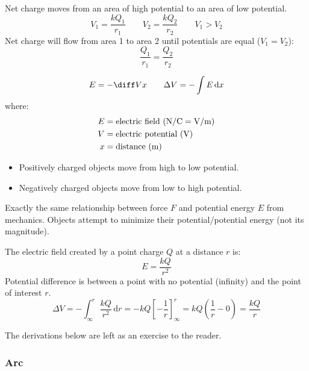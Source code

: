 \documentclass{article}
\newcommand{\theorem}[2]{\begin{tcolorbox}[title={#1},colback=blue!5!white,colframe=blue!75!black,parbox=false] #2 \end{tcolorbox}}
\newcommand{\example}[2]{\begin{tcolorbox}[title={Example: #1},colback=brown!5!white,colframe=brown!75!black,parbox=false] #2 \end{tcolorbox}}
\begin{document}
\theorem{Net charge and potential}{
	Net charge moves from an area of high potential to an area of low potential.
	\begin{equation*}
		V_1=\frac{kQ_1}{r_1} \qquad
		V_2=\frac{kQ_2}{r_2} \qquad
		V_1>V_2
	\end{equation*}
	Net charge will flow from area 1 to area 2 until potentials are equal ($V_1=V_2$):
	\begin{equation*}
		\frac{Q_1}{r_1}
		=\frac{Q_2}{r_2}
	\end{equation*}
}

\theorem{Potential and electric field}{
	\begin{equation*}
	    E=-\diff Vx \qquad \Delta V=-\int E\,\mathrm{d}x
	\end{equation*}
	where:
	\begin{align*}
		E&=\text{electric field (\si{N/C=V/m})} \\
		V&=\text{electric potential (\si{V})} \\
		x&=\text{distance (m)}
	\end{align*}
	\begin{itemize}
		\item Positively charged objects move from high to low potential.
		\item Negatively charged objects move from low to high potential.
	\end{itemize}
}
Exactly the same relationship between force $F$ and potential energy $E$ from mechanics. Objects attempt to minimize their potential/potential energy (not its magnitude).

\example{Potential and electric field of point charge}{
	The electric field created by a point charge $Q$ at a distance $r$ is:
	\begin{equation*}
	    E=\frac{kQ}{r^2}
	\end{equation*}
	Potential difference is between a point with no potential (infinity) and the point of interest $r$.
	\begin{equation*}
	    \Delta V=-\int_{\infty}^{r}\frac{kQ}{r^2}\,\mathrm{d}r
		=-kQ \left[-\frac{1}{r}\right]_{\infty}^{r}
		=kQ \left( \frac1r-0 \right)
		=\frac{kQ}{r}
	\end{equation*}
}

The derivations below are left as an exercise to the reader.

\subsubsection{Arc}
\end{document}
